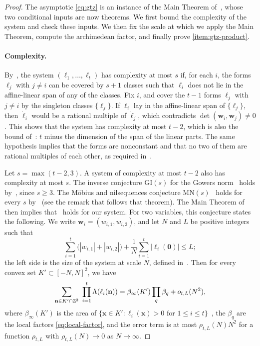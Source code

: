 \begin{proof}
The asymptotic \eqref{eq:gtz} is an instance of the Main Theorem of~\cite{GT2010}, whose two conditional inputs are now theorems. We first bound the complexity of the system and check these inputs. We then fix the scale at which we apply the Main Theorem, compute the archimedean factor, and finally prove \ref{item:gtz-product}.

\paragraph{Complexity.} By~\cite[Definition~1.5]{GT2010}, the system $(\ell_1,\dots,\ell_t)$ has complexity at most $s$ if, for each $i$, the forms $\ell_j$ with $j\ne i$ can be covered by $s+1$ classes such that $\ell_i$ does not lie in the affine-linear span of any of the classes. Fix $i$, and cover the $t-1$ forms $\ell_j$ with $j\ne i$ by the singleton classes $\{\ell_j\}$. If $\ell_i$ lay in the affine-linear span of $\{\ell_j\}$, then $\dot\ell_i$ would be a rational multiple of $\dot\ell_j$, which contradicts $\det(\mathbf w_i,\mathbf w_j)\ne0$. This shows that the system has complexity at most $t-2$, which is also the bound of~\cite[Lemma~1.6]{GT2010}: $t$ minus the dimension of the span of the linear parts. The same hypothesis implies that the forms are nonconstant and that no two of them are rational multiples of each other, as required in~\cite[Definition~1.1]{GT2010}.

Let $s=\max(t-2,3)$. A system of complexity at most $t-2$ also has complexity at most $s$. The inverse conjecture $\mathrm{GI}(s)$ for the Gowers norm~\cite[Conjecture~8.3]{GT2010} holds by~\cite[Theorem~1.3]{GTZ2012}, since $s\ge3$. The M\"obius and nilsequences conjecture $\mathrm{MN}(s)$~\cite[Conjecture~8.5]{GT2010} holds for every $s$ by~\cite[Theorem~1.1]{GT2012} (see the remark that follows that theorem). The Main Theorem of~\cite{GT2010} then implies that~\cite[Conjecture~1.2]{GT2010} holds for our system. For two variables, this conjecture states the following. We write $\mathbf w_i=(w_{i,1},w_{i,2})$, and let $N$ and $L$ be positive integers such that
\begin{equation}\label{eq:gt-size}
\sum_{i=1}^t\big(|w_{i,1}|+|w_{i,2}|\big)+\frac1N\sum_{i=1}^t|\ell_i(\mathbf 0)|\le L;
\end{equation}
the left side is the size of the system at scale $N$, defined in~\cite[(1.1)]{GT2010}. Then for every convex set $K'\subset[-N,N]^2$, we have
\begin{equation}\label{eq:gt-conjecture}
\sum_{\mathbf n\in K'\cap\mathbb Z^2}\ \prod_{i=1}^t\Lambda(\ell_i(\mathbf n))=\beta_\infty(K')\prod_q\beta_q+o_{t,L}(N^2),
\end{equation}
where $\beta_\infty(K')$ is the area of $\{\mathbf x\in K':\ell_i(\mathbf x)>0\text{ for }1\le i\le t\}$~\cite[(1.4)]{GT2010}, the $\beta_q$ are the local factors \eqref{eq:local-factor}, and the error term is at most $\rho_{t,L}(N)N^2$ for a function $\rho_{t,L}$ with $\rho_{t,L}(N)\to0$ as $N\to\infty$.


\end{proof}
